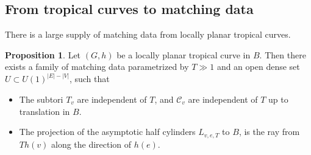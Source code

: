 \documentclass{article}
\theoremstyle{definition}
\newtheorem{prop}[thm]{Proposition}
\begin{document}
	
	
	
	\subsection{From tropical curves to matching data}
	
	
	
	
	There is a large supply of matching data from locally planar tropical curves.
	
	
	
	\begin{prop}\label{prop: tropicaltomatchingdata}
		Let $(G,h)$ be a locally planar tropical curve in $B$. Then there exists a family of matching data parametrized by $T\gg 1$ and an open dense set $U\subset U(1)^{|E|-|V|}$, such that 
		\begin{itemize}
			\item The subtori $T_v$ are independent of $T$, and $\mathcal{C}_v$ are independent of $T$ up to translation in $B$.
			
			
			\item  The projection of the asymptotic half cylinders $L_{v,e,T}$ to $B$, is the ray from $Th(v)$ along the direction of $h(e)$.
		\end{itemize}
		
		
		
	\end{prop}
	
	
	
	
	
\end{document}
